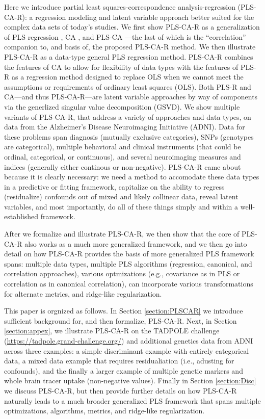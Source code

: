 \documentclass[12pt]{article}
\begin{document}
Here we introduce partial least squares-correspondence
analysis-regression (PLS-CA-R): a regression modeling and latent
variable approach better suited for the complex data sets of today's
studies. We first show PLS-CA-R as a generalization of PLS regression
\citep{wold_soft_1975, wold_collinearity_1984, tenenhaus_regression_1998, abdi_partial_2010-1},
CA
\citep{greenacre_theory_1984, greenacre_correspondence_2010-1, lebart_multivariate_1984},
and PLS-CA \citep{beaton_partial_2016}---the last of which is the
``correlation'' companion to, and basis of, the proposed PLS-CA-R
method. We then illustrate PLS-CA-R as a data-type general PLS
regression method. PLS-CA-R combines the features of CA to allow for
flexibility of data types with the features of PLS-R as a regression
method designed to replace OLS when we cannot meet the assumptions or
requirements of ordinary least squares (OLS). Both PLS-R and CA---and
thus PLS-CA-R---are latent variable approaches by way of components via
the generlized singular value decomposition (GSVD). We show multiple
variants of PLS-CA-R, that address a variety of approaches and data
types, on data from the Alzheimer's Disease Neuroimaging Initiative
(ADNI). Data for these problems span diagnosis (mutually exclusive
categories), SNPs (genotypes are categorical), multiple behavioral and
clinical instruments (that could be ordinal, categorical, or
continuous), and several neuroimaging measures and indices (generally
either continous or non-negative). PLS-CA-R came about because it is
clearly necessary: we need a method to accomodate these data types in a
predictive or fitting framework, capitalize on the ability to regress
(residualize) confounds out of mixed and likely collinear data, reveal
latent variables, and most importantly, do all of these things simply
and within a well-established framework.

After we formalize and illustrate PLS-CA-R, we then show that the core
of PLS-CA-R also works as a much more generalized framework, and we then
go into detail on how PLS-CA-R provides the basis of more generalized
PLS framework spans: multiple data types, multiple PLS algorithms
(regression, canonical, and correlation approaches), various
optmizations (e.g., covariance as in PLS or correlation as in canonical
correlation), can incorporate various transformations for alternate
metrics, and ridge-like regularization.

This paper is orgnized as follows. In Section \ref{section:PLSCAR} we
introduce sufficient background for, and then formalize, PLS-CA-R. Next,
in Section \ref{section:appex}, we illustrate PLS-CA-R on the TADPOLE
challenge (\url{https://tadpole.grand-challenge.org/}) and additional
genetics data from ADNI across three examples: a simple discriminant
example with entirely categorical data, a mixed data example that
requires residualiation (i.e., adusting for confounds), and the finally
a larger example of multiple genetic markers and whole brain tracer
uptake (non-negative values). Finally in Section \ref{section:Disc} we
discuss PLS-CA-R, but then provide further details on how PLS-CA-R
naturally leads to a much broader generalized PLS framework that spans
multiple optimizations, algorithms, metrics, and ridge-like
regularization.
\end{document}
